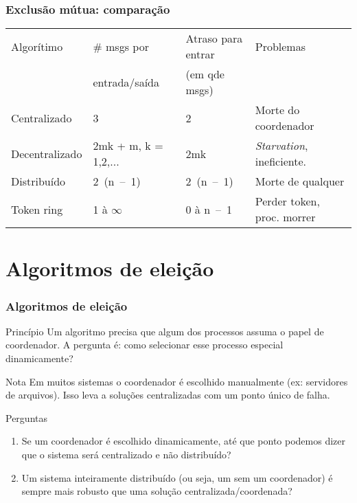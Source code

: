 \documentclass[Ligatures=TeX,table,brazil,svgnames,usetotalslideindicator,compress,10pt]{beamer}
\begin{document}
\begin{frame}
  \frametitle{Exclusão mútua: comparação}

  \begin{center}
    \footnotesize
    \renewcommand{\arraystretch}{1.2}
    \begin{tabular}{|l|l|l|l|}\hline
      \alert{Algorítimo} 	& \alert{\# msgs por} & \alert{Atraso para entrar} & \alert{Problemas} \\
      & \alert{entrada/saída} & \alert{(em qde msgs)} & \\ \hline
      Centralizado & 3 & 2 & Morte do coordenador \\ \hline
      Decentralizado & 2mk + m, k = 1,2,... & 2mk & \textit{Starvation}, ineficiente.              \\ \hline
      Distribuído & 2~(n~--~1) & 2~(n~--~1) & Morte de qualquer \\ \hline
      Token ring & 1 à $\infty$ & 0 à n~--~1 & Perder token,  proc. morrer\\ \hline
    \end{tabular}
  \end{center}


\end{frame}

\section{Algoritmos de eleição}

\begin{frame}
  \frametitle{Algoritmos de eleição}
  \begin{block}{Princípio}
    Um algoritmo precisa que algum dos processos assuma o papel de coordenador. A pergunta é: como selecionar esse processo especial \alert{dinamicamente}?
  \end{block}

  \begin{block}{Nota}
    Em muitos sistemas o coordenador é escolhido manualmente (ex: servidores de arquivos). Isso leva a soluções centralizadas com um ponto único de falha.
  \end{block}

  \begin{block}{Perguntas}
    \begin{enumerate}
    \item Se um coordenador é escolhido dinamicamente, até que ponto podemos dizer que o sistema será centralizado e não distribuído?
    \item Um sistema inteiramente distribuído (ou seja, um sem um coordenador) é sempre mais robusto que uma solução centralizada/coordenada?
    \end{enumerate}
  \end{block}

\end{frame}
\end{document}
